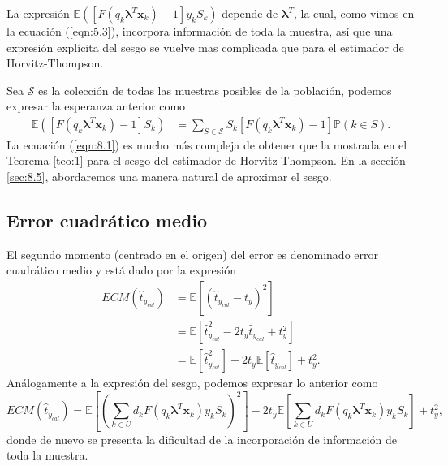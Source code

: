 \documentclass[a4paper,twoside,openright,12pt]{book}
\theoremstyle{definition}
\newcommand\pref[1]{(\ref{#1})}
\numberwithin{equation}{chapter}
\numberwithin{figure}{chapter}
\numberwithin{table}{chapter}
\numberwithin{theorem}{chapter}
\numberwithin{lemma}{chapter}
\begin{document}
La expresión $\mathbb{E}\left([F(q_k\mathbf{\lambda}^T \mathbf x_k)-1] y_k S_k\right)$ depende de $\mathbf{\lambda}^T$, la cual, como vimos en la ecuación \pref{eqn:5.3}, incorpora información de toda la muestra, así que una expresión explícita del sesgo se vuelve mas complicada que para el estimador de Horvitz-Thompson.

Sea $\mathcal{S}$ es la colección de todas las muestras posibles de la población, podemos expresar la esperanza anterior como
\begin{align}\label{eqn:8.1}
	\mathbb{E}\left([F(q_k\mathbf{\lambda}^T \mathbf x_k)-1] S_k\right)&=\sum_{S\in\mathcal{S}}S_k[F(q_k\mathbf{\lambda}^T \mathbf x_k)-1]\mathbb P(k\in S).
\end{align}
La ecuación \pref{eqn:8.1} es mucho más compleja de obtener que la mostrada en el Teorema \ref{teo:1} para el sesgo del estimador de Horvitz-Thompson. En la sección \ref{sec:8.5}, abordaremos una manera natural de aproximar el sesgo.
\subsection{Error cuadrático medio}
El segundo momento (centrado en el origen) del error es denominado error cuadrático medio y está dado por la expresión
\begin{align*}
	ECM(\hat t_{y_{cal}})&=\mathbb E\left[(\hat t_{y_{cal}}-t_{y})^2\right]\\
					&=\mathbb E\left[\hat t_{y_{cal}}^2-2t_y\hat t_{y_{cal}}+t_y^2\right]\\
					&=\mathbb E\left[\hat t_{y_{cal}}^2\right]-2t_y\mathbb E\left[\hat t_{y_{cal}}\right]+t_y^2.
\end{align*}
Análogamente a la expresión del sesgo, podemos expresar lo anterior como
$$ECM(\hat t_{y_{cal}})=\mathbb E\left[\left(\sum_{k\in U}d_kF(q_k\mathbf{\lambda}^T \mathbf x_k) y_k S_k\right)^2\right]-2t_y\mathbb E\left[\sum_{k\in U}d_kF(q_k\mathbf{\lambda}^T \mathbf x_k) y_k S_k\right]+t_y^2,$$
donde de nuevo se presenta la dificultad de la incorporación de información de toda la muestra.
\end{document}
